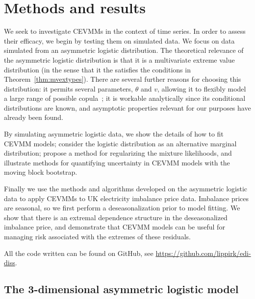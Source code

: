 \documentclass[11pt,twoside,openany]{book}
\numberwithin{Theorem}{chapter}
\numberwithin{Definition}{chapter}
\numberwithin{Lemma}{chapter}
\numberwithin{Algorithm}{chapter}
\numberwithin{equation}{chapter}
\begin{document}
\clearpage

\chapter{Methods and results}\label{sec:methods}
We seek to investigate CEVMMs in the
context of time series. In order to assess their efficacy, we begin by testing
them on simulated data. We focus on data simulated from an asymmetric logistic
distribution. The theoretical relevance of the asymmetric
logistic distribution is that it is a multivariate extreme value distribution
(in the sense that it the satisfies the conditions in
Theorem~\ref{thm:mvextypes}). There are several further reasons for choosing
this distribution: it permits several parameters, $\theta$ and $v$, allowing it
to flexibly model a large range of possible
copula~\citep{coles1991modelling}; it is workable analytically since its
conditional distributions are known, and asymptotic properties relevant for our
purposes have already been found.

By simulating asymmetric logistic data, we show the details of how to fit CEVMM
models; consider the logistic distribution as an alternative marginal
distribution; propose a method for regularizing the mixture likelihoods, and
illustrate methods for quantifying uncertainty in CEVMM models with the
moving block bootstrap.

Finally we use the methods and algorithms developed
on the asymmetric logistic data to apply CEVMMs
to UK electricity imbalance price data.
Imbalance prices are seasonal, so we first perform a deseasonalization
prior to model fitting. We show that there is an extremal dependence structure
in the deseasonalized imbalance price, and demonstrate that
CEVMM models can be useful for managing risk associated with the extremes of
these residuals.

All the code written can be found on GitHub, see \url{https://github.com/lippirk/edi-diss}.

\section{The 3-dimensional asymmetric logistic model}\label{sec:asymlog}
\end{document}
